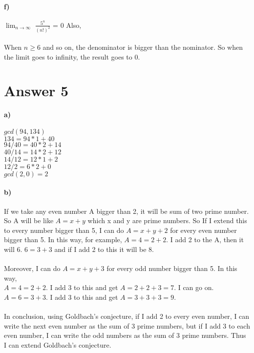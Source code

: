 \documentclass[12pt]{article}
\begin{document}
\paragraph{f)} $\lim_{n\to\infty}$ $\frac{5^{n}}{(n!)^{2}}$ = 0 Also, \\
\\
When $n \ge 6$ and so on, the denominator is bigger than the nominator. So when the limit goes to infinity, the result goes to 0.

\section*{Answer 5}
\paragraph{a)} $gcd(94,134)$\\
$134 = 94*1 + 40$ \\
$94/40 = 40*2 +14$\\
$40/14 = 14*2 + 12$\\
$14/12 = 12*1 + 2$\\
$12/2 = 6*2 + 0$\\
$gcd(2,0) = 2$
\paragraph{b)} If we take any even number A bigger than 2, it will be sum of two prime number. So A will be like  $A = x+y$ which x and y are prime numbers. So If I extend this to every number bigger than 5, I can do $A=x+y+2$ for every even number bigger than 5. In this way, for example, $A = 4 = 2+2$. I add 2 to the A, then it will 6. $6 = 3+3$ and if I add 2 to this it will be 8.\\
\\
Moreover, I can do $A=x+y+3$ for every odd number bigger than 5. In this way,\\
$A = 4 = 2+2$. I add 3 to this and get $A = 2+2+3 = 7$. I can go on. $A = 6 = 3 +3$. I add 3 to this and get $A = 3+3+3 = 9$. \\
\\
 In conclusion, using Goldbach's conjecture, if I add 2 to every even number, I can write the next even number as the sum of 3 prime numbers, but if I add 3 to each even number, I can write the odd numbers as the sum of 3 prime numbers. Thus I can extend Goldbach's conjecture.
\end{document}
